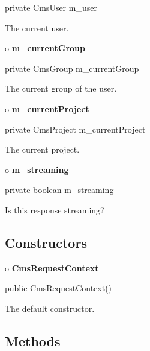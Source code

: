 \begin{PRE}
 private CmsUser m\_user
\end{PRE}

\begin{description}
\htmlDD The current user.

\end{description}

o {\bf m\_currentGroup} 

\begin{PRE}
 private CmsGroup m\_currentGroup
\end{PRE}

\begin{description}
\htmlDD The current group of the user.

\end{description}

o {\bf m\_currentProject} 

\begin{PRE}
 private CmsProject m\_currentProject
\end{PRE}

\begin{description}
\htmlDD The current project.

\end{description}

o {\bf m\_streaming} 

\begin{PRE}
 private boolean m\_streaming
\end{PRE}

\begin{description}
\htmlDD Is this response streaming?

\end{description}

\subsection*{  Constructors }

o {\bf CmsRequestContext} 

\begin{PRE}
 public CmsRequestContext()
\end{PRE}

\begin{description}
\htmlDD The default constructor. 

\end{description}

\subsection*{  Methods }

